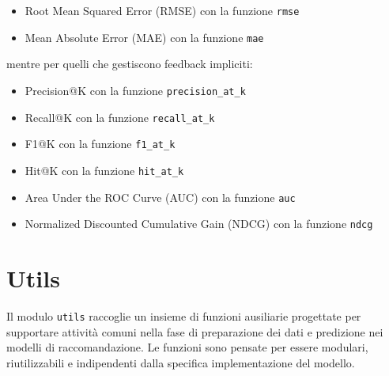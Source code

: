 \begin{itemize}
    \item Root Mean Squared Error (RMSE) con la funzione \texttt{rmse}
    \item Mean Absolute Error (MAE) con la funzione \texttt{mae}
\end{itemize}

mentre per quelli che gestiscono feedback impliciti:

\begin{itemize}
    \item Precision@K con la funzione \texttt{precision\_at\_k}
    \item Recall@K con la funzione \texttt{recall\_at\_k}
    \item F1@K con la funzione \texttt{f1\_at\_k}
    \item Hit@K con la funzione \texttt{hit\_at\_k}
    \item Area Under the ROC Curve (AUC) con la funzione \texttt{auc}
    \item Normalized Discounted Cumulative Gain (NDCG) con la funzione \texttt{ndcg}
\end{itemize}

\section{Utils}

Il modulo \texttt{utils} raccoglie un insieme di funzioni ausiliarie progettate per supportare attività comuni nella fase di preparazione dei dati e predizione nei modelli di raccomandazione. Le funzioni sono pensate per essere modulari, riutilizzabili e indipendenti dalla specifica implementazione del modello.


